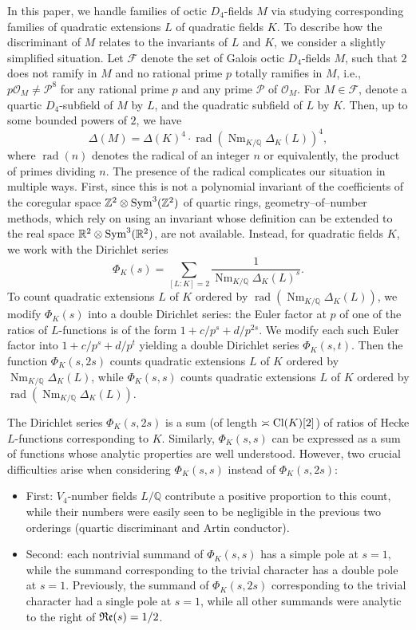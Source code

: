 \documentclass[10pt]{article}
\theoremstyle{plain}
\theoremstyle{definition}
\theoremstyle{remark}
\DeclareMathOperator{\Cl}{Cl}
\DeclareMathOperator{\rad}{rad}
\DeclareMathOperator{\Sym}{Sym}
\renewcommand{\Re}{\frak{Re}}
\def\Z{{\mathbb Z}}
\def\Cl{{\rm Cl}}
\def\Sym{{\rm Sym}}
\def\R{{\mathbb R}}
\def\FF{{\mathcal F}}
\def\Q{{\mathbb Q}}
\def\Z{{\mathbb Z}}
\def\Q{{\mathbb Q}}
\def\cF{{\mathcal F}}
\def\cO{{\mathcal O}}
\newcommand{\cP}{\mathcal{P}}
\DeclareMathOperator{\Nm}{Nm}
\begin{document}
In this paper, we handle families of octic $D_4$-fields $M$ via
studying corresponding families of quadratic extensions $L$ of
quadratic fields $K$. To describe how the discriminant of $M$ relates
to the invariants of $L$ and $K$, we consider a slightly simplified
situation.
Let $\FF$ denote the set of Galois octic $D_4$-fields
$M$, such that $2$ does not ramify in $M$ and no rational prime $p$ totally
ramifies in $M$, i.e., $p\cO_M \neq \cP^8$ for any rational prime $p$ and any prime $\cP$ of $\cO_M$. For $M \in \cF$, denote a quartic
$D_4$-subfield of $M$ by $L$, and the quadratic subfield of $L$ by
$K$. Then, up to some bounded powers of $2$, we have
\begin{equation*}
\Delta(M)=\Delta(K)^4\cdot \rad(\Nm_{K/\Q}\Delta_K(L))^4,
\end{equation*}
where $\rad(n)$ denotes the radical of an integer $n$ or equivalently,
the product of primes dividing $n$. The presence of the radical
complicates our situation in multiple ways. First, since this is not a
polynomial invariant of the coefficients of the coregular space
$\Z^2\otimes\Sym^3(\Z^2)$ of quartic rings, geometry--of--number
methods, which rely on using an invariant whose definition can be extended to the real space $\R^2 \otimes \Sym^3(\R^2)$, are not available. Instead, for quadratic fields
$K$, we work with the Dirichlet series
\begin{equation*}
\Phi_K(s)=\sum_{[L:K]=2}\frac{1}{\Nm_{K/\Q}\Delta_K(L)^s}.
\end{equation*}
To count quadratic extensions $L$ of $K$ ordered by
$\rad(\Nm_{K/\Q}\Delta_K(L))$, we modify $\Phi_K(s)$ into a double
Dirichlet series: the Euler factor at $p$ of one of the ratios of
$L$-functions is of the form $1+c/p^s+d/p^{2s}$. We modify each such
Euler factor into $1+c/p^s+d/p^t$ yielding a double Dirichlet series
$\Phi_K(s,t)$.  Then the function $\Phi_K(s,2s)$ counts quadratic
extensions $L$ of $K$ ordered by $\Nm_{K/\Q}\Delta_K(L)$, while
$\Phi_K(s,s)$ counts quadratic extensions $L$ of $K$ ordered by
$\rad(\Nm_{K/\Q}\Delta_K(L))$.

The Dirichlet series $\Phi_K(s,2s)$ is a sum (of length $\asymp
\Cl(K)[2]$) of ratios of Hecke $L$-functions corresponding to
$K$. Similarly, $\Phi_K(s,s)$ can be expressed as a sum
of functions whose analytic properties are well understood. However,
two crucial difficulties arise when considering $\Phi_K(s,s)$ instead of $\Phi_K(s,2s)$:
\begin{itemize}
\item[{\rm (a)}] First: $V_4$-number fields
  $L/\Q$ contribute a positive proportion to this count, while 
  their numbers were easily seen to be negligible in the previous two orderings (quartic discriminant and Artin conductor).
\item[{\rm (b)}] Second: each nontrivial summand of $\Phi_K(s,s)$ has a simple pole at
  $s=1$, while the summand corresponding to the trivial character has
  a double pole at $s=1$. Previously, the summand of $\Phi_K(s,2s)$
  corresponding to the trivial character had a single pole at $s=1$,
  while all other summands were analytic to the right of $\Re(s)=1/2$.
\end{itemize}
\end{document}
